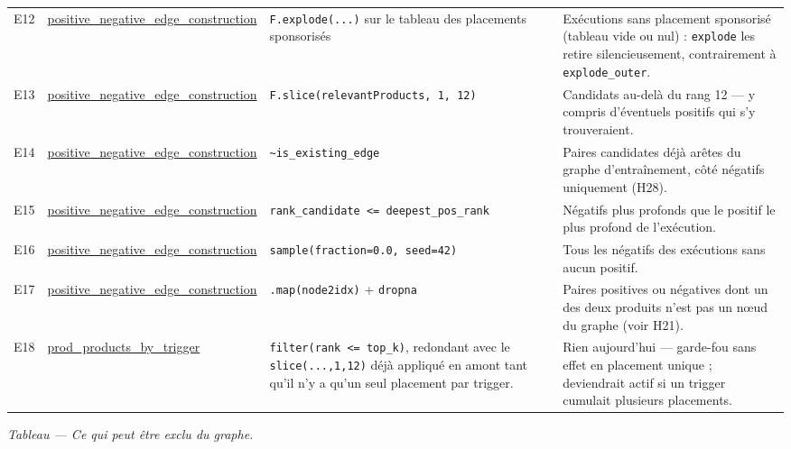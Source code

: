 \documentclass[11pt,a4paper]{article}
\newcommand{\code}[1]{\texttt{\small #1}}
\begin{document}
{\begin{longtable}{@{}l p{3.2cm} p{4.4cm} p{5.2cm}@{}}
\addlinespace
E12 & \url{positive_negative_edge_construction} & \code{F.explode(...)} sur le tableau des placements sponsorisés & Exécutions sans placement sponsorisé (tableau vide ou nul) : \code{explode} les retire silencieusement, contrairement à \code{explode\_outer}. \\
\addlinespace
E13 & \url{positive_negative_edge_construction} & \code{F.slice(relevantProducts, 1, 12)} & Candidats au-delà du rang 12 --- y compris d'éventuels positifs qui s'y trouveraient. \\
\addlinespace
E14 & \url{positive_negative_edge_construction} & \code{\textasciitilde{}is\_existing\_edge} & Paires candidates déjà arêtes du graphe d'entraînement, côté négatifs uniquement (H28). \\
\addlinespace
E15 & \url{positive_negative_edge_construction} & \code{rank\_candidate <= deepest\_pos\_rank} & Négatifs plus profonds que le positif le plus profond de l'exécution. \\
\addlinespace
E16 & \url{positive_negative_edge_construction} & \code{sample(fraction=0.0, seed=42)} & Tous les négatifs des exécutions sans aucun positif. \\
\addlinespace
E17 & \url{positive_negative_edge_construction} & \code{.map(node2idx)} + \code{dropna} & Paires positives ou négatives dont un des deux produits n'est pas un nœud du graphe (voir H21). \\
\addlinespace
E18 & \url{prod_products_by_trigger} & \code{filter(rank <= top\_k)}, redondant avec le \code{slice(...,1,12)} déjà appliqué en amont tant qu'il n'y a qu'un seul placement par trigger. & Rien aujourd'hui --- garde-fou sans effet en placement unique ; deviendrait actif si un trigger cumulait plusieurs placements. \\

\end{longtable}
}
\label{tab:exclusions}
\begin{center}\footnotesize\itshape Tableau \thetable{} --- Ce qui peut être exclu du graphe.\end{center}
\end{document}

